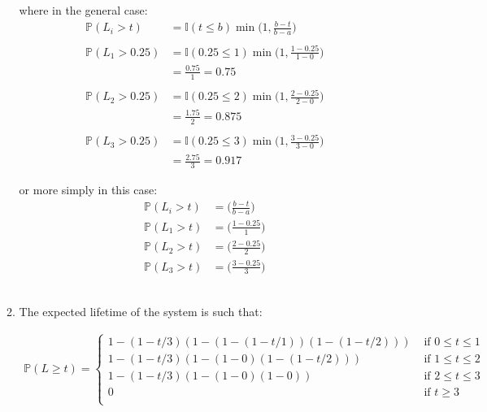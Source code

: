 \documentclass{article}
\begin{document}
\begin{enumerate}
\begin{enumerate}
        where in the general case:
        \begin{equation}
            \begin{split}
                \mathbb{P}{(L_i > t)} &= \mathbb{I}{(t \leq b) \min{\Big(1, \frac{b-t}{b-a}}\Big)}\\~\\
                \mathbb{P}{(L_1 > 0.25)} &= \mathbb{I}{(0.25 \leq 1) \min{\Big(1, \frac{1-0.25}{1-0}}\Big)}\\
                & = \frac{0.75}{1} = 0.75\\~\\
                \mathbb{P}{(L_2 > 0.25)} &= \mathbb{I}{(0.25 \leq 2) \min{\Big(1, \frac{2-0.25}{2-0}}\Big)}\\
                & = \frac{1.75}{2} = 0.875\\~\\
                \mathbb{P}{(L_3 > 0.25)} &= \mathbb{I}{(0.25 \leq 3) \min{\Big(1, \frac{3-0.25}{3-0}}\Big)}\\
                & = \frac{2.75}{3} = 0.917
            \end{split}
        \end{equation}

        or more simply in this case:
        \begin{equation}
            \begin{split}
                \mathbb{P}{(L_i > t)} &= \Big(\frac{b-t}{b-a}\Big)\\
                \mathbb{P}{(L_1 > t)} &= \Big(\frac{1-0.25}{1}\Big)\\
                \mathbb{P}{(L_2 > t)} &= \Big(\frac{2-0.25}{2}\Big)\\
                \mathbb{P}{(L_3 > t)} &= \Big(\frac{3-0.25}{3}\Big)
            \end{split}
        \end{equation}\\

        \item The expected lifetime of the system is such that:

        \begin{equation}
            \begin{split}
                \mathbb{P}{(L \geq t)} = \begin{cases}
                    1-(1-t/3)(1-(1-(1-t/1))(1-(1-t/2))) & \text{ if } 0 \leq t \leq 1\\
                    1-(1-t/3)(1-(1-0)(1-(1-t/2))) & \text{ if } 1 \leq t \leq 2\\
                    1-(1-t/3)(1-(1-0)(1-0)) & \text{ if } 2 \leq t \leq 3\\
                    0 & \text{ if } t \geq 3\\
                \end{cases}
            \end{split}
        \end{equation}\\


\end{enumerate}
\end{enumerate}
\end{document}
